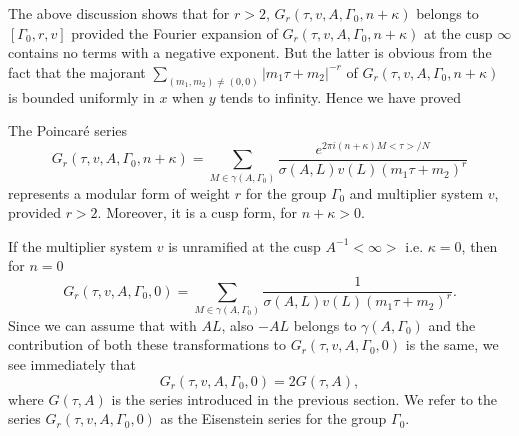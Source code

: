 The above discussion shows that for $r>2$, $G_r(\tau, v, A, \Gamma_0,
n+\kappa)$ belongs to $[\Gamma_0, r, v]$ provided the Fourier
expansion of $G_r(\tau, v, A, \Gamma_0, n + \kappa)$ at the cusp
$\infty$ contains no terms with a negative exponent. But the latter is
obvious from the fact that the majorant
$\sum\limits_{(m_1,m_2)\neq(0,0)}|m_1\tau+m_2|^{-r}$ of $G_r(\tau,v,
A,\Gamma_0, n+\kappa)$ is bounded uniformly in $x$ when $y$ tends to
infinity. Hence we have proved 

\begin{thm}\label{chap3:thm20}
The Poincar\'e series
$$
G_r(\tau, v, A, \Gamma_0, n+\kappa) = \sum_{M\in
  \gamma(A,\Gamma_0)} \frac{e^{2\pi i
    (n+\kappa)M<\tau>/N}}{\sigma(A,L)v(L)(m_1\tau+m_2)^r} 
$$
represents a modular form of weight $r$ for the group $\Gamma_0$ and
multiplier system $v$, provided $r>2$. Moreover, it is a cusp form,
for $n+\kappa>0$.
\end{thm}

If the multiplier system $v$ is unramified at the cusp
$A^{-1}<\infty>$ i.e. $\kappa=0$, then for $n=0$
$$
G_r(\tau, v, A, \Gamma_0, 0) = \sum_{M\in \gamma(A,\Gamma_0)}
\frac{1}{\sigma(A,L)v(L)(m_1\tau+m_2)^r}. 
$$
Since we can assume that with $AL$, also $-AL$ belongs to
$\gamma(A,\Gamma_0)$ and the contribution of both these
transformations to $G_r(\tau, v, A, \Gamma_0, 0)$ is the same, we see
immediately that
$$
G_r(\tau, v, A, \Gamma_0,0) = 2G(\tau, A),
$$
where \pageoriginale $G(\tau, A)$ is the series introduced in the
previous section. We refer to the series $G_r(\tau, v, A, \Gamma_0,0)$
as the Eisenstein series for the group $\Gamma_0$.

